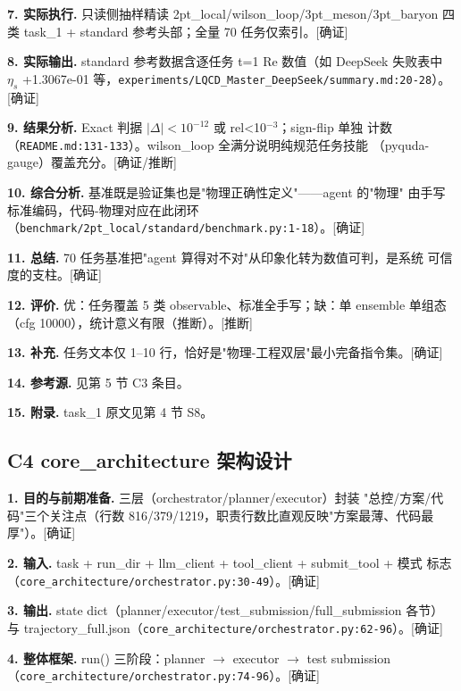 \documentclass[UTF8]{ctexart}
\begin{document}
\noindent\textbf{7. 实际执行.} 只读侧抽样精读 2pt\_local/wilson\_loop/3pt\_meson/3pt\_baryon
四类 task\_1 + standard 参考头部；全量 70 任务仅索引。[确证]

\noindent\textbf{8. 实际输出.} standard 参考数据含逐任务 t=1 Re 数值（如 DeepSeek 失败表中
$\eta_s$ +1.3067e-01 等，\texttt{\nolinkurl{experiments/LQCD_Master_DeepSeek/summary.md:20-28}}）。[确证]

\noindent\textbf{9. 结果分析.} Exact 判据 $|\Delta|<10^{-12}$ 或 rel<10$^{-3}$；sign-flip 单独
计数（\texttt{\nolinkurl{README.md:131-133}}）。wilson\_loop 全满分说明纯规范任务技能
（pyquda-gauge）覆盖充分。[确证/推断]

\noindent\textbf{10. 综合分析.} 基准既是验证集也是"物理正确性定义"——agent 的"物理"
由手写标准编码，代码-物理对应在此闭环（\texttt{\nolinkurl{benchmark/2pt_local/standard/benchmark.py:1-18}}）。[确证]

\noindent\textbf{11. 总结.} 70 任务基准把"agent 算得对不对"从印象化转为数值可判，是系统
可信度的支柱。[确证]

\noindent\textbf{12. 评价.} 优：任务覆盖 5 类 observable、标准全手写；缺：单 ensemble 单组态
（cfg 10000），统计意义有限（推断）。[推断]

\noindent\textbf{13. 补充.} 任务文本仅 1--10 行，恰好是"物理-工程双层"最小完备指令集。[确证]

\noindent\textbf{14. 参考源.} 见第 5 节 C3 条目。

\noindent\textbf{15. 附录.} task\_1 原文见第 4 节 S8。

\subsection{C4 core\_architecture 架构设计}

\noindent\textbf{1. 目的与前期准备.} 三层（orchestrator/planner/executor）封装
"总控/方案/代码"三个关注点（行数 816/379/1219，职责行数比直观反映"方案最薄、代码最厚"）。[确证]

\noindent\textbf{2. 输入.} task + run\_dir + llm\_client + tool\_client + submit\_tool + 模式
标志（\texttt{\nolinkurl{core_architecture/orchestrator.py:30-49}}）。[确证]

\noindent\textbf{3. 输出.} state dict（planner/executor/test\_submission/full\_submission 各节）
与 trajectory\_full.json（\texttt{\nolinkurl{core_architecture/orchestrator.py:62-96}}）。[确证]

\noindent\textbf{4. 整体框架.} run() 三阶段：planner $\rightarrow$ executor $\rightarrow$
test submission（\texttt{\nolinkurl{core_architecture/orchestrator.py:74-96}}）。[确证]
\end{document}
